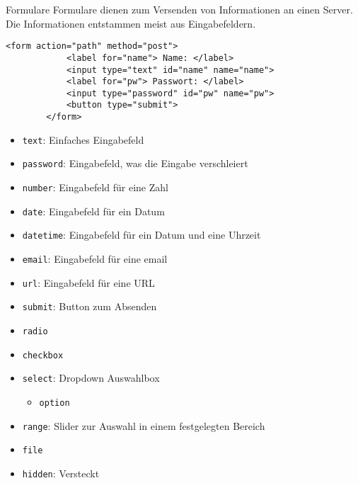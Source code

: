 \begin{bonus}{Formulare}
    Formulare dienen zum Versenden von Informationen an einen Server.
    Die Informationen entstammen meist aus Eingabefeldern.

    \begin{lstlisting}[language=HTML5]
        <form action="path" method="post">
            <label for="name"> Name: </label>
            <input type="text" id="name" name="name">
            <label for="pw"> Passwort: </label>
            <input type="password" id="pw" name="pw">
            <button type="submit">
        </form>
    \end{lstlisting}

    \begin{itemize}
        \item \texttt{text}: Einfaches Eingabefeld
        \item \texttt{password}: Eingabefeld, was die Eingabe verschleiert
        \item \texttt{number}: Eingabefeld für eine Zahl
        \item \texttt{date}: Eingabefeld für ein Datum
        \item \texttt{datetime}: Eingabefeld für ein Datum und eine Uhrzeit
        \item \texttt{email}: Eingabefeld für eine email
        \item \texttt{url}: Eingabefeld für eine URL
        \item \texttt{submit}: Button zum Absenden
        \item \texttt{radio}
        \item \texttt{checkbox}
        \item \texttt{select}: Dropdown Auswahlbox
              \begin{itemize}
                  \item \texttt{option}
              \end{itemize}
        \item \texttt{range}: Slider zur Auswahl in einem festgelegten Bereich
        \item \texttt{file}
        \item \texttt{hidden}: Versteckt
    \end{itemize}
\end{bonus}